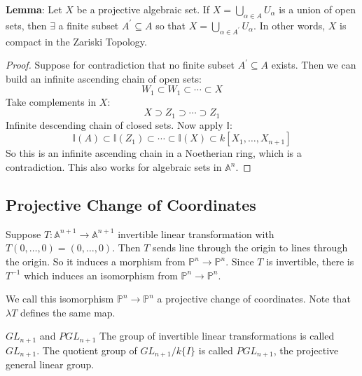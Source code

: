 \documentclass{report}
\begin{document}
\textbf{Lemma}: Let $X$ be a projective algebraic set. If $X = \bigcup_{\alpha \in A}U_{\alpha}$ is a union of open sets, then $\exists$ a finite subset $A^{\prime} \subseteq A$ so that $X = \bigcup_{\alpha \in A^{\prime}}U_{\alpha}$. In other words, $X$ is compact in the Zariski Topology.
    \begin{proof}
        Suppose for contradiction that no finite subset $A^{\prime} \subseteq A$ exists. Then we can build an infinite ascending chain of open sets:
            \begin{equation*}
                W_{1} \subset W_{1} \subset \cdots \subset X
            \end{equation*}
        Take complements in $X$: 
            \begin{equation*}
                X \supset Z_{1} \supset \cdots \supset Z_{1}
            \end{equation*}
        Infinite descending chain of closed sets. Now apply $\mathbb{I}$:
            \begin{equation*}
                \mathbb{I}(A) \subset \mathbb{I}(Z_{1}) \subset \cdots \subset \mathbb{I}(X) \subset k[X_{1}, \ldots, X_{n + 1}]
            \end{equation*}
        So this is an infinite ascending chain in a Noetherian ring, which is a contradiction. This also works for algebraic sets in $\mathbb{A}^{n}$.
    \end{proof}

\begin{topic}
    \section{Projective Change of Coordinates}
\end{topic}

Suppose $T : \mathbb{A}^{n + 1} \rightarrow \mathbb{A}^{n + 1}$ invertible linear transformation with $T(0, \ldots, 0) = (0, \ldots, 0)$. Then $T$ sends line through the origin to lines through the origin. So it induces a morphism from $\mathbb{P}^{n} \rightarrow \mathbb{P}^{n}$. Since $T$ is invertible, there is $T^{-1}$ which induces an isomorphism from $\mathbb{P}^{n} \rightarrow \mathbb{P}^{n}$.

We call this isomorphism $\mathbb{P}^{n} \rightarrow \mathbb{P}^{n}$ a projective change of coordinates. Note that $\lambda T$ defines the same map.

\begin{definition}{$GL_{n + 1}$ and $PGL_{n + 1}$}
    The group of invertible linear transformations is called $GL_{n + 1}$. The quotient group of $GL_{n + 1}/k\{I\}$ is called $PGL_{n + 1}$, the projective general linear group.
\end{definition}
\end{document}
